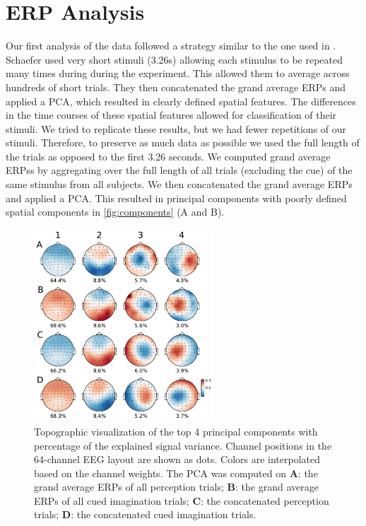 \chapter{ERP Analysis}

Our first analysis of the data followed a strategy similar to the one used in \cite{schaefer_name_2011}.
Schaefer \etal \cite{schaefer_name_2011} used very short stimuli (3.26s) allowing each stimulus to be repeated many times during during the experiment. 
This allowed them to average across hundreds of short trials. 
They then concatenated the grand average ERPs and applied a \ac{PCA}, which resulted in clearly defined spatial features. 
The differences in the time courses of these spatial features allowed for classification of their stimuli. 
We tried to replicate these results, but we had fewer repetitions of our stimuli. 
Therefore, to preserve as much data as possible we used the full length of the trials as opposed to the first 3.26 seconds. 
We computed grand average \acp{ERP}s by aggregating over the full length of all trials (excluding the cue) of the same stimulus from all subjects. 
We then concatenated the grand average \acp{ERP} and applied a \ac{PCA}. 
This resulted in principal components with poorly defined spatial components in \autoref{fig:components} (A and B).
\begin{figure}[htb]	%
  \centerline{\includegraphics[width=0.6\textwidth]{Figures/principle_components.pdf}}
  \caption{Topographic visualization of the top 4 principal components with percentage of the explained signal variance. Channel positions in the 64-channel EEG layout are shown as dots. Colors are interpolated based on the channel weights. The PCA was computed on {\bf A}: the grand average \acp{ERP} of all perception trials; {\bf B}: the grand average \acp{ERP} of all cued imagination trials; {\bf C}: the concatenated perception trials; {\bf D}: the concatenated cued imagination trials.}
  \label{fig:components}
\end{figure}

